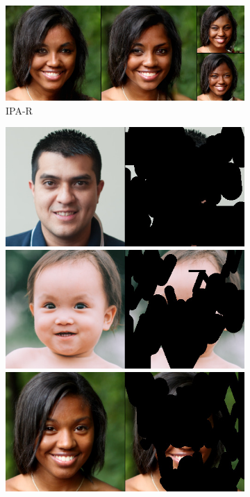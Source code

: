 \begin{figure}[t]
\begin{subfigure}[t]{0.25\textwidth}
      \includegraphics[height=\ffhqimgheight]{figs/cigcvae/image-samples/ffhq256/freeform_aipo-r_32_samples.jpg}
      \caption{IPA-R}
    \end{subfigure}
    \begin{subfigure}[t]{0.22\textwidth}
      \centering
      \includegraphics[height=\ffhqimgheight]{figs/cigcvae/image-samples/ffhq256/freeform_aipo_0_gt_masked.jpg}
      \includegraphics[height=\ffhqimgheight]{figs/cigcvae/image-samples/ffhq256/freeform_aipo_13_gt_masked.jpg}
      \includegraphics[height=\ffhqimgheight]{figs/cigcvae/image-samples/ffhq256/freeform_aipo_32_gt_masked.jpg}

\end{subfigure}
\end{figure}
